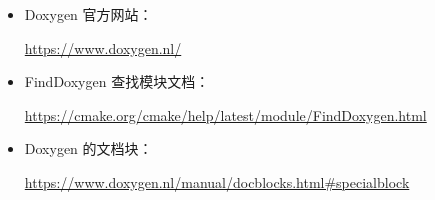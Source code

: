 

\begin{itemize}
\item
Doxygen 官方网站：

\url{https://www.doxygen.nl/}

\item
FindDoxygen 查找模块文档：

\url{https://cmake.org/cmake/help/latest/module/FindDoxygen.html}

\item
Doxygen 的文档块：

\url{https://www.doxygen.nl/manual/docblocks.html#specialblock}
\end{itemize}